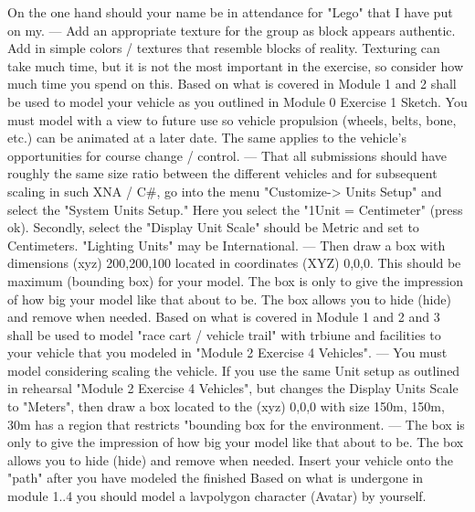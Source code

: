 On the one hand should your name be in attendance for "Lego" that I have put on my.
---
Add an appropriate texture for the group as block appears authentic. 
Add in simple colors / textures that resemble blocks of reality. 
Texturing can take much time, but it is not the most important in the exercise, so consider how much time you spend on this.
\vspace{0.5em}\newline
Based on what is covered in Module 1 and 2 shall be used to model your vehicle as you outlined in Module 0 Exercise 1 Sketch. 
You must model with a view to future use so vehicle propulsion (wheels, belts, bone, etc.) can be animated at a later date. 
The same applies to the vehicle's opportunities for course change / control.
---
That all submissions should have roughly the same size ratio between the different vehicles and for subsequent scaling in such XNA / C\#, 
go into the menu "Customize-> Units Setup" and select the "System Units Setup." 
Here you select the "1Unit = Centimeter" (press ok). 
Secondly, select the "Display Unit Scale" should be Metric and set to Centimeters. 
"Lighting Units" may be International.
---
Then draw a box with dimensions (xyz) 200,200,100 located in coordinates (XYZ) 0,0,0. 
This should be maximum (bounding box) for your model. The box is only to give the impression of how big your model like that about to be. 
The box allows you to hide (hide) and remove when needed.
\vspace{0.5em}\newline
Based on what is covered in Module 1 and 2 and 3 shall be used to model "race cart / vehicle trail" with trbiune and facilities to your vehicle that you modeled in 
"Module 2 Exercise 4 Vehicles".
---
You must model considering scaling the vehicle. 
If you use the same Unit setup as outlined in rehearsal "Module 2 Exercise 4 Vehicles", but changes the Display Units Scale to "Meters", 
then draw a box located to the (xyz) 0,0,0 with size 150m, 150m, 30m has a region that restricts "bounding box for the environment.
---
The box is only to give the impression of how big your model like that about to be. 
The box allows you to hide (hide) and remove when needed. 
Insert your vehicle onto the "path" after you have modeled the finished
\vspace{0.5em}\newline
Based on what is undergone in module 1..4 you should model a lavpolygon character (Avatar) by yourself. 
